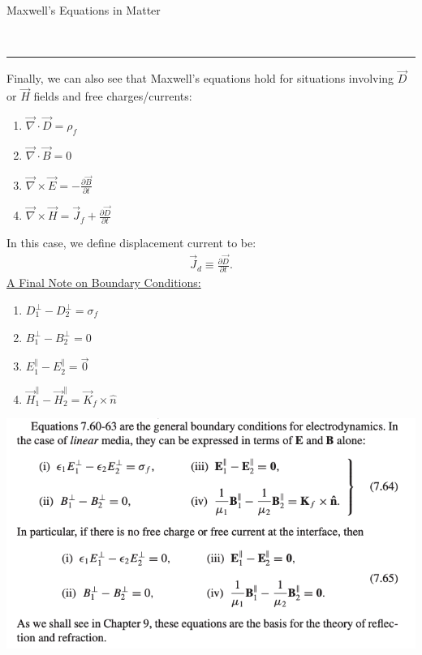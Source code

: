 \documentclass{article}
\newcommand{\header}[1]{\begin{large}\noindent #1\end{large}\\\rule{\textwidth}{0.5pt}}
\newcommand{\sheader}[1]{\underline{#1:}}
\begin{document}
\pagebreak

\header{Maxwell's Equations in Matter} 
Finally, we can also see that Maxwell's equations hold for situations involving $\vec{D}$
or $\vec{H}$ fields and free charges/currents:

\begin{enumerate}[label=(\roman*)]
    \item $\vec{\nabla} \cdot \vec{D} = \rho_f$
    \item $\vec{\nabla} \cdot \vec{B} = 0$
    \item $\vec{\nabla} \times \vec{E} = - \frac{\partial \vec{B}}{\partial t}$
    \item $\vec{\nabla} \times \vec{H} = \vec{J}_f + \frac{\partial \vec{D}}{\partial t}$
\end{enumerate}
In this case, we define displacement current to be:
\begin{align*}
    \vec{J}_d \equiv \frac{\partial \vec{D}}{\partial t}.
\end{align*}
\sheader{A Final Note on Boundary Conditions}
\begin{enumerate}
    \item $D_1^\perp - D_2^\perp = \sigma_f$
    \item $B_1^\perp - B_2^\perp = 0$
    \item $E^\parallel_1 - E^\parallel_2 = \vec{0}$
    \item $\vec{H}^\parallel_1 - \vec{H}_2^\parallel = \vec{K}_f \times \hat{n}$
\end{enumerate}

\includegraphics[scale=0.4]{boundary-conditions.png}
\end{document}
